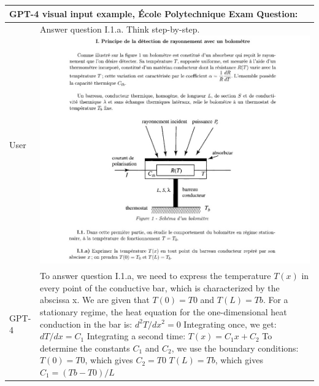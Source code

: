 \documentclass{article}
\begin{document}
\begin{table}
\begin{tabular}[]{p{0.5in}p{4.5in}}
\toprule
\multicolumn{2}{p{5in}}{
\textbf{GPT-4 visual input example, \'Ecole Polytechnique Exam Question}:}\\
\midrule
User & Answer question I.1.a. Think step-by-step.\newline\newline
\includegraphics[width=0.8\linewidth]{assets/mp-physique.jpg}\newline
\\
GPT-4 & To answer question I.1.a, we need to express the temperature $T(x)$ in every point of the conductive bar, which is characterized by the abscissa x. We are given that $T(0) = T0$ and $T(L) = Tb$.\newline
\newline
For a stationary regime, the heat equation for the one-dimensional heat conduction in the bar is:\newline
$d^2T/dx^2 = 0$\newline
\newline
Integrating once, we get:\newline
$dT/dx = C_1$\newline
\newline
Integrating a second time:\newline
$T(x) = C_1x + C_2$\newline
\newline
To determine the constants $C_1$ and $C_2$, we use the boundary conditions:\newline
$T(0) = T0$, which gives $C_2 = T0$\newline
$T(L) = Tb$, which gives $C_1 = (Tb - T0) / L$\newline

\end{tabular}
\end{table}
\end{document}
